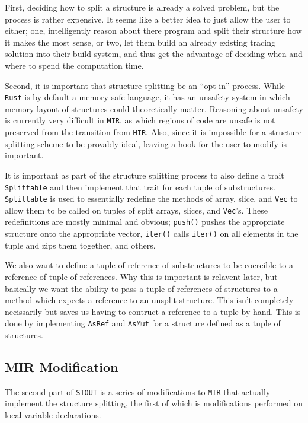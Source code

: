 \documentclass[prodmode,acmtecs]{acmsmall} %
\newcommand{\rustname}{{\texttt{Rust}}}
\def \rust {\rustname{}\xspace}
\newcommand{\mirname}{{\texttt{MIR}}}
\def \mir {\mirname{}\xspace}
\newcommand{\hirname}{{\texttt{HIR}}}
\def \hir {\hirname{}\xspace}
\newcommand{\vecname}{{\texttt{Vec}}}
\def \vec{\vecname{}\xspace}
\newcommand{\projectname}{{\texttt{STOUT}}}
\def \name{\projectname\xspace}
\begin{document}
First, deciding how to split a structure is already a solved problem,
but the process is rather expensive. 
It seems like a better idea to just 
allow the user to either; one, 
intelligently reason about there program and split their structure 
how it makes the most sense, or two, 
let them build an already existing tracing solution into their build system,
and thus get the advantage of deciding when and where to spend the 
computation time.

Second, it is important that structure splitting be an ``opt-in'' process.
While \rust is by default a memory safe language, it has an
unsafety system in which memory layout of structures could theoretically matter.
Reasoning about unsafety is currently very difficult in \mir, as
which regions of code are unsafe is not preserved from the transition
from \hir. Also, since it is impossible for a structure splitting scheme
to be provably ideal, leaving a hook for the user to modify is important.

It is important as part of the structure splitting process to also
define a trait \texttt{Splittable} and then implement that
trait for each tuple of substructures.
\texttt{Splittable} is used to essentially redefine
the methods of array, slice, and \vec 
to allow them to be called on tuples of split
arrays, slices, and \vec's.  These redefinitions are mostly minimal
and obvious; 
\texttt{push()} pushes the appropriate structure onto the appropriate
vector, \texttt{iter()} calls \texttt{iter()} on all
elements in the tuple and zips them together, and others.

We also want to define a tuple of reference of substructures 
to be coercible to a reference of tuple of references. Why this is 
important is relavent later, but basically
we want the ability to pass a tuple of references 
of structures to a method which expects a reference to an 
unsplit structure. This isn't completely necissarily but 
saves us having to contruct a reference to a tuple by hand.
This is done by implementing \texttt{AsRef} and \texttt{AsMut}
for a structure defined as a tuple of structures.

\subsection{MIR Modification}

The second part of \name is a series of modifications to \mir that actually
implement the structure splitting, the first of which is modifications performed on
local variable declarations.
\end{document}
